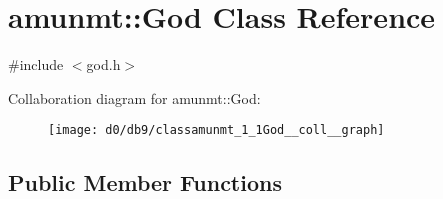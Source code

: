 \hypertarget{classamunmt_1_1God}{}\section{amunmt\+:\+:God Class Reference}
\label{classamunmt_1_1God}


{\ttfamily \#include $<$god.\+h$>$}



Collaboration diagram for amunmt\+:\+:God\+:
\nopagebreak
\begin{figure}[H]
\begin{center}
\leavevmode
\texttt{[image: d0/db9/classamunmt\_1\_1God\_\_coll\_\_graph]}
\end{center}
\end{figure}
\subsection*{Public Member Functions}
